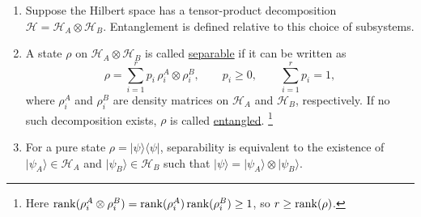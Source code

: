 \begin{enumerate}
    \item Suppose the Hilbert space has a tensor-product decomposition
    $\mathcal{H}=\mathcal{H}_A\otimes\mathcal{H}_B$.
    Entanglement is defined relative to this choice of subsystems.

    \item A state $\rho$ on $\mathcal{H}_A\otimes\mathcal{H}_B$ is called
    \underline{separable} if it can be written as
    \[
        \rho
        =
        \sum_{i=1}^r
        p_i\,\rho_i^A\otimes\rho_i^B,
        \qquad
        p_i\geq 0,
        \qquad
        \sum_{i=1}^r p_i=1,
    \]
    where $\rho_i^A$ and $\rho_i^B$ are density matrices on
    $\mathcal{H}_A$ and $\mathcal{H}_B$, respectively.
    If no such decomposition exists, $\rho$ is called \underline{entangled}. \footnote{Here $\operatorname{rank}(\rho_i^A\otimes\rho_i^B)=\operatorname{rank}(\rho_i^A) \operatorname{rank}(\rho_i^B)\ge 1$, so $r \ge \operatorname{rank}(\rho)$.}
    
    \item For a pure state $\rho=|\psi\rangle\langle\psi|$,
    separability is equivalent to the existence of
    $|\psi_A\rangle\in\mathcal{H}_A$ and
    $|\psi_B\rangle\in\mathcal{H}_B$ such that $|\psi\rangle = |\psi_A\rangle\otimes|\psi_B\rangle$.


\end{enumerate}
